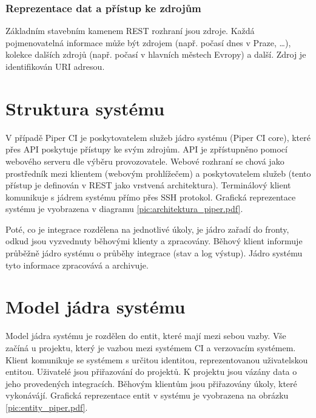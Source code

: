 \subsubsection{Reprezentace dat a přístup ke zdrojům}

Základním stavebním kamenem REST rozhraní jsou zdroje.
Každá pojmenovatelná informace může být zdrojem (např. počasí dnes v Praze, \ldots), kolekce dalších zdrojů (např. počasí v hlavních městech Evropy) a další.
Zdroj je identifikován URI adresou.
\cite{rest_zdroje}

\section{Struktura systému}

V případě Piper CI je poskytovatelem služeb jádro systému (Piper CI core), které přes API poskytuje přístupy ke svým zdrojům.
API je zpřístupněno pomocí webového serveru dle výběru provozovatele.
Webové rozhraní se chová jako prostředník mezi klientem (webovým prohlížečem) a poskytovatelem služeb (tento přístup je definován v REST jako vrstvená architektura).
Terminálový klient komunikuje s jádrem systému přímo přes SSH protokol.
Grafická reprezentace systému je vyobrazena v diagramu \ref{pic:architektura_piper.pdf}.


Poté, co je integrace rozdělena na jednotlivé úkoly, je jádro zařadí do fronty, odkud jsou vyzvednuty běhovými klienty a zpracovány.
Běhový klient informuje průběžně jádro systému o průběhy integrace (stav a log výstup).
Jádro systému tyto informace zpracovává a archivuje.

\section{Model jádra systému}

Model jádra systému je rozdělen do entit, které mají mezi sebou vazby.
Vše začíná u projektu, který je vazbou mezi systémem CI a verzovacím systémem.
Klient komunikuje se systémem s určitou identitou, reprezentovanou uživatelskou entitou.
Uživatelé jsou přiřazování do projektů.
K projektu jsou vázány data o jeho provedených integracích.
Běhovým klientům jsou přiřazovány úkoly, které vykonávájí.
Grafická reprezentace entit v systému je vyobrazena na obrázku \ref{pic:entity_piper.pdf}.


